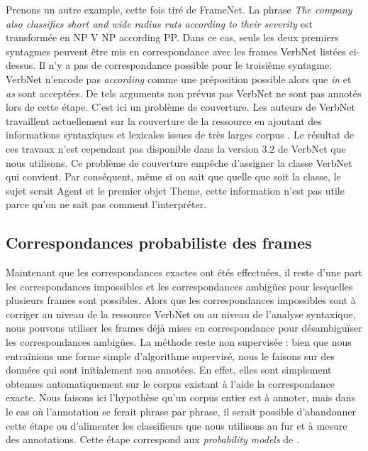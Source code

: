 Prenons un autre example, cette fois tiré de FrameNet. La phrase \emph{The
company also classifies short and wide radius ruts according to their severity}
est transformée en NP V NP according PP. Dans ce cas, seuls les deux premiers
syntagmes peuvent être mis en correspondance avec les frames VerbNet listées
ci-dessus. Il n'y a pas de correspondance possible pour le troisième syntagme:
VerbNet n'encode pas \emph{according} comme une préposition possible alors que
\emph{in} et \emph{as} sont acceptées. De tels arguments non prévus pas VerbNet
ne sont pas annotés lors de cette étape. C'est ici un problème de couverture.
Les auteurs de VerbNet travaillent actuellement sur la couverture de la
ressource en ajoutant des informations syntaxiques et lexicales issues de très
larges corpus \citep{bonial2013expanding}. Le résultat de ces travaux n'est
cependant pas disponible dans la version 3.2 de VerbNet que nous utilisons. Ce
problème de couverture empêche d'assigner la classe VerbNet qui convient. Par
conséquent, même si on sait que quelle que soit la classe, le sujet serait
Agent et le premier objet Theme, cette information n'est pas utile parce qu'on
ne sait pas comment l'interpréter.

\subsection{Correspondances probabiliste des frames}
\label{subsec:probability}

Maintenant que les correspondances exactes ont étés effectuées, il reste d'une
part les correspondances impossibles et les correspondances ambigües pour
lesquelles plusieurs frames sont possibles. Alors que les correspondances
impossibles sont à corriger au niveau de la ressource VerbNet ou au niveau de
l'analyse syntaxique, nous pouvons utiliser les frames déjà mises en
correspondance pour désambiguïser les correspondances ambigües. La méthode
reste non supervisée : bien que nous entraînions une forme simple d'algorithme
supervisé, nous le faisons sur des données qui sont initialement non annotées.
En effet, elles sont simplement obtenues automatiquement sur le corpus existant
à l'aide la correspondance exacte. Nous faisons ici l'hypothèse qu'un corpus
entier est à annoter, mais dans le cas où l'annotation se ferait phrase par
phrase, il serait possible d'abandonner cette étape ou d'alimenter les
classifieurs que nous utilisons au fur et à mesure des annotations. Cette étape
correspond aux \emph{probability models} de \citet{swier2004unsupervised}.


